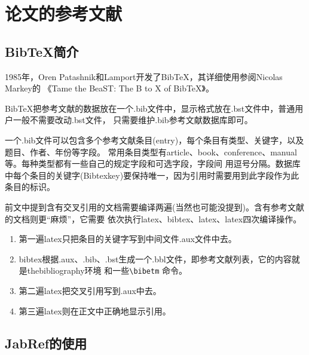 \chapter{论文的参考文献}
\section{BibTeX简介}
1985年，Oren Patashnik和Lamport开发了BibTeX，其详细使用参阅Nicolas Markey的
《Tame the BeaST: The B to X of BibTeX》。

BibTeX把参考文献的数据放在一个.bib文件中，显示格式放在.bst文件中，普通用户一般不需要改动.bst文件，
只需要维护.bib参考文献数据库即可。

一个.bib文件可以包含多个参考文献条目(entry)，每个条目有类型、关键字，以及题目、作者、年份等字段。
常用条目类型有article、book、conference、manual等。每种类型都有一些自己的规定字段和可选字段，字段间
用逗号分隔。数据库中每个条目的关键字(Bibtexkey)要保持唯一，因为引用时需要用到此字段作为此条目的标识。

前文中提到含有交叉引用的文档需要编译两遍(当然也可能没提到)。含有参考文献的文档则更“麻烦”，它需要
依次执行latex、bibtex、latex、latex四次编译操作。
\begin{enumerate}
\item 第一遍latex只把条目的关键字写到中间文件.aux文件中去。
\item bibtex根据.aux、.bib、.bst生成一个.bbl文件，即参考文献列表，它的内容就是thebibliography环境
和一些\verb|\bibetm| 命令。
\item 第二遍latex把交叉引用写到.aux中去。
\item 第三遍latex则在正文中正确地显示引用。
\end{enumerate}
\section{JabRef的使用}

